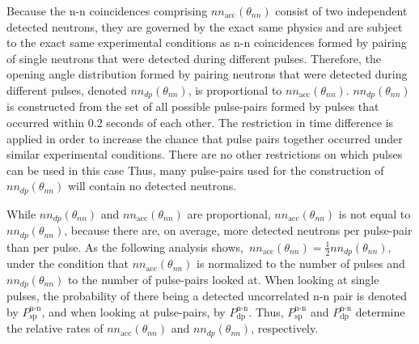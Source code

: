 Because the n-n coincidences comprising $nn_{\text{acc}}(\theta_{nn})$ consist of two independent detected neutrons, they are governed by the exact same physics and are subject to the exact same experimental conditions as n-n coincidences formed by pairing of single neutrons that were detected during different pulses.
Therefore, the opening angle distribution formed by pairing neutrons that were detected during different pulses, denoted $nn_{dp}(\theta_{nn})$, is proportional to $nn_{\text{acc}}(\theta_{nn})$.
$nn_{dp}(\theta_{nn})$ is constructed from the set of all possible pulse-pairs formed by pulses that occurred within 0.2 seconds of each other.
The restriction in time difference is applied in order to increase the chance that pulse pairs together occurred under similar experimental conditions.
There are no other restrictions on which pulses can be used in this case
Thus, many pulse-pairs used for the construction of $nn_{dp}(\theta_{nn})$ will contain no detected neutrons.

While $nn_{dp}(\theta_{nn})$ and $nn_{\text{acc}}(\theta_{nn})$ are proportional, $nn_{\text{acc}}(\theta_{nn})$ is not equal to $nn_{dp}(\theta_{nn})$,  because there are, on average, more detected neutrons per pulse-pair than per pulse.
As the following analysis shows,~$nn_{\text{acc}}(\theta_{nn}) = \frac{1}{2}nn_{dp}(\theta_{nn})$, under the condition that $nn_{\text{acc}}(\theta_{nn})$ is normalized to the number of pulses and $nn_{dp}(\theta_{nn})$ to the number of pulse-pairs looked at.
When looking at single pulses, the probability of there being a detected uncorrelated n-n pair is denoted by $P^{\text{n-n}}_{\text{sp}}$, and when looking at pulse-pairs, by $P^{\text{n-n}}_{\text{dp}}$.
Thus, $P^{\text{n-n}}_{\text{sp}}$ and $P^{\text{n-n}}_{\text{dp}}$ determine the relative rates of $nn_{\text{acc}}(\theta_{nn})$ and $nn_{dp}(\theta_{nn})$, respectively.

